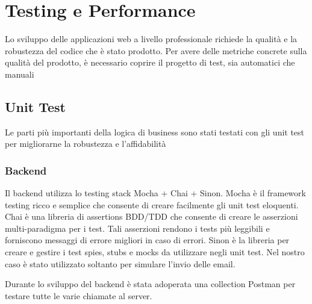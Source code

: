 

\chapter{Testing e Performance}

Lo sviluppo delle applicazioni web a livello professionale richiede la qualità e la robustezza del codice che è stato prodotto. Per avere delle metriche concrete sulla qualità
del prodotto, è necessario coprire il progetto di test, sia automatici che manuali

\section{Unit Test}
Le parti più importanti della logica di business sono stati testati con gli unit test per migliorarne la robustezza e l'affidabilità
 \subsection{Backend}
 Il backend utilizza lo testing stack Mocha + Chai + Sinon. 
Mocha è il framework testing ricco e semplice che consente di creare facilmente
gli unit test eloquenti.
Chai è una libreria di assertions BDD/TDD che consente di creare le asserzioni
multi-paradigma per i test. Tali asserzioni rendono i tests più leggibili e forniscono messaggi di errore migliori in caso di errori. 
Sinon è la libreria per creare e gestire i test spies, stubs e mocks da utilizzare
negli unit test. Nel nostro caso è stato utilizzato soltanto per simulare l'invio delle email.

Durante lo sviluppo del backend è stata adoperata una collection Postman per testare tutte le varie chiamate al server. 
